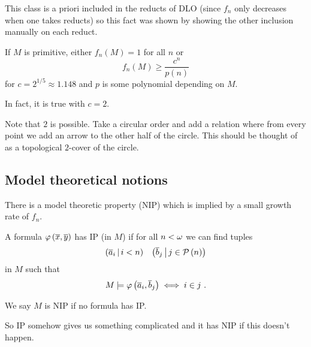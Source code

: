 \documentclass{amsart}
\begin{document}
\begin{rmk}
This class is a priori included in the reducts of DLO (since $f_n$ only decreases when one
takes reducts) so this fact was shown by showing the other inclusion manually on each
reduct.
\end{rmk}

\begin{fact}[Macpherson]
If $M$ is primitive, either $f_n\left(M\right) = 1$ for all $n$ or 
\begin{equation}
f_n\left(M\right) \geq\frac{c^n}{p\left(n\right)}
\end{equation}
for $c = 2^{1/5}\approx 1.148$ and $p$ is some polynomial depending on $M$.
\end{fact}

\begin{con}
In fact, it is true with $c = 2$.
\end{con}

\begin{exm}
Note that $2$ is possible.
Take a circular order and add a relation where from every point we add an arrow to the
other half of the circle. This should be thought of as a topological $2$-cover of the
circle. 
\end{exm}

\subsection{Model theoretical notions}

There is a model theoretic property (NIP) 
which is implied by a small growth rate of $f_n$.

\begin{defn}
A formula $\varphi\left(\overline{x} , \overline{y}\right)$
has IP (in $M$) if for all $n < \omega$ we can find tuples 
\begin{align}
\left(\overline{a}_i \, \middle\vert \, i < n\right) &&
\left(\overline{b}_j \, \middle\vert \, j\in \mathcal{P}\left(n\right)\right)
\end{align}
in $M$ such that 
\begin{equation}
M\models \varphi\left(\overline{a}_i , \overline{b}_j\right) \iff i\in j \ .
\end{equation}
\end{defn}

\begin{defn}
We say $M$ is NIP if no formula has IP.
\end{defn}

So IP somehow gives us something complicated and it has NIP if this doesn't happen. 
\end{document}
